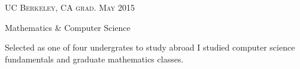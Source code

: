 {\raggedright
  \textsc{\small{UC Berkeley, CA
    \hfill
    {\raggedleft
      grad. May 2015
    }
  }}

  {\raggedright\large {
    Mathematics \& Computer Science
  } \\}

  \normalsize{
    Selected as one of four undergrates to study abroad I studied computer science fundamentals and graduate mathematics classes.
  }

  \vspace{8pt}
}
